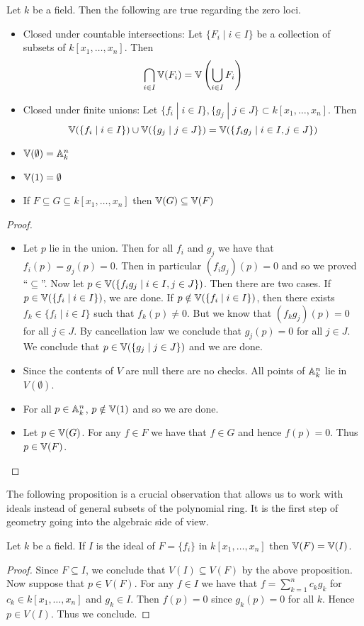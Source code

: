 \documentclass[a4paper]{article}
\begin{document}
\begin{prp}{}{} Let $k$ be a field. Then the following are true regarding the zero loci. 
\begin{itemize}
\item Closed under countable intersections: Let $\{F_i\;|\;i\in I\}$ be a collection of subsets of $k[x_1,\dots,x_n]$. Then $$\bigcap_{i\in I}\mathbb{V}(F_i)=\mathbb{V}\left(\bigcup_{i\in I}F_i\right)$$
\item Closed under finite unions: Let $\{f_i\;|\;i\in I\},\{g_j\;|\;j\in J\}\subset k[x_1,\dots,x_n]$. Then $$\mathbb{V}(\{f_i\;|\;i\in I\})\cup\mathbb{V}(\{g_j\;|\;j\in J\})=\mathbb{V}(\{f_ig_j\;|\;i\in I, j\in J\})$$
\item $\mathbb{V}(\emptyset)=\mathbb{A}_k^n$
\item $\mathbb{V}(1)=\emptyset$
\item If $F\subseteq G\subseteq k[x_1,\dots,x_n]$ then $\mathbb{V}(G)\subseteq\mathbb{V}(F)$
\end{itemize}\tcbline
\begin{proof}~\\
\begin{itemize}
\item Let $p$ lie in the union. Then for all $f_i$ and $g_j$ we have that $f_i(p)=g_j(p)=0$. Then in particular $(f_ig_j)(p)=0$ and so we proved ``$\subseteq$''. Now let $p\in\mathbb{V}(\{f_ig_j\;|\;i\in I, j\in J\})$. Then there are two cases. If $p\in\mathbb{V}(\{f_i\;|\;i\in I\})$, we are done. If $p\notin\mathbb{V}(\{f_i\;|\;i\in I\})$, then there exists $f_k\in\{f_i\;|\;i\in I\}$ such that $f_k(p)\neq 0$. But we know that $(f_kg_j)(p)=0$ for all $j\in J$. By cancellation law we conclude that $g_j(p)=0$ for all $j\in J$. We conclude that $p\in\mathbb{V}(\{g_j\;|\;j\in J\})$ and we are done. 
\item Since the contents of $V$ are null there are no checks. All points of $\mathbb{A}_k^n$ lie in $V(\emptyset)$. 
\item For all $p\in\mathbb{A}_k^n$, $p\notin\mathbb{V}(1)$ and so we are done. 
\item Let $p\in\mathbb{V}(G)$. For any $f\in F$ we have that $f\in G$ and hence $f(p)=0$. Thus $p\in\mathbb{V}(F)$. 
\end{itemize}
\end{proof}
\end{prp}

The following proposition is a crucial observation that allows us to work with ideals instead of general subsets of the polynomial ring. It is the first step of geometry going into the algebraic side of view. 

\begin{prp}{}{} Let $k$ be a field. If $I$ is the ideal of $F=\{f_i\}$ in $k[x_1,\dots,x_n]$ then $\mathbb{V}(F)=\mathbb{V}(I)$. \tcbline
\begin{proof}
Since $F\subseteq I$, we conclude that $V(I)\subseteq V(F)$ by the above proposition. Now suppose that $p\in V(F)$. For any $f\in I$ we have that $f=\sum_{k=1}^nc_kg_k$ for $c_k\in k[x_1,\dots,x_n]$ and $g_k\in I$. Then $f(p)=0$ since $g_k(p)=0$ for all $k$. Hence $p\in V(I)$. Thus we conclude. 
\end{proof}
\end{prp}
\end{document}
